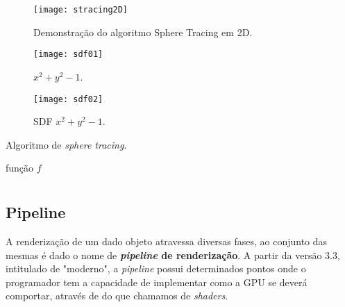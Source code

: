 \begin{figure}[!htbp]
	\centering
	\texttt{[image: stracing2D]}
	\caption[Demonstração do algoritmo Sphere Tracing em 2D]{Demonstração do algoritmo Sphere Tracing em 2D.}
	\label{fig::stracing2D}
\end{figure}

\begin{figure}[!htbp]
	\centering
	\texttt{[image: sdf01]}
	\caption[]{$x^2 + y^2 - 1$.}
	\label{fig::sdf01}
\end{figure}

\begin{figure}[!htbp]
	\centering
	\texttt{[image: sdf02]}
	\caption[]{\acf{SDF} $x^2 + y^2 - 1$.}
	\label{fig::sdf02}
\end{figure}

\begin{algorithm}[!htbp]
	\caption{Algoritmo de \textit{sphere tracing}.}
	\label{alg::raymarch_spheretrace}
	\begin{algorithmic}
\Require função $f$      
	\end{algorithmic}
\end{algorithm}


\section{\opengl}
\label{sec::arte:opengl}



\subsection{Pipeline}
A renderização de um dado objeto atravessa diversas fases, ao conjunto das mesmas é dado o nome de \textbf{\textit{pipeline} de renderização}. A partir da versão 3.3, intitulado de "\opengl moderno", a \textit{pipeline} possui determinados pontos onde o programador tem a capacidade de implementar como a \ac{GPU} se deverá comportar, através de do que chamamos de \textit{shaders}.

